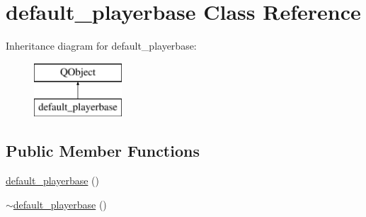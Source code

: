 \hypertarget{classdefault__playerbase}{\section{default\-\_\-playerbase Class Reference}
\label{classdefault__playerbase}
}
Inheritance diagram for default\-\_\-playerbase\-:\begin{figure}[H]
\begin{center}
\leavevmode
\includegraphics[height=2.000000cm]{classdefault__playerbase}
\end{center}
\end{figure}
\subsection*{Public Member Functions}
\begin{DoxyCompactItemize}
\item 
\hyperlink{classdefault__playerbase_ad96867ee8989920a4a72556b0a3441ec}{default\-\_\-playerbase} ()
\item 
\hyperlink{classdefault__playerbase_a621f3dd0b418ebea179a748e7e875d5d}{$\sim$default\-\_\-playerbase} ()
\end{DoxyCompactItemize}
